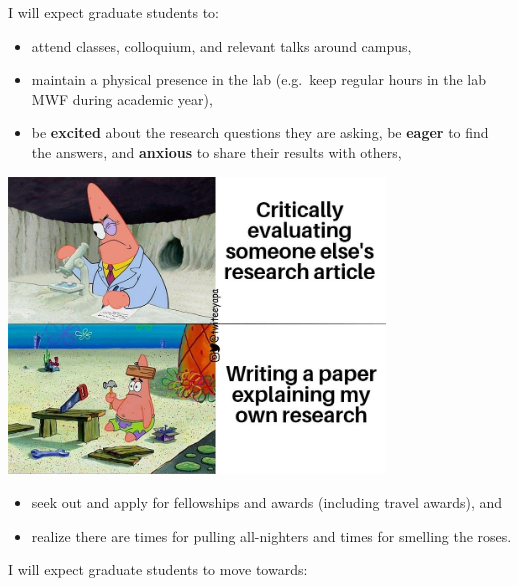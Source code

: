 \documentclass[
]{book}
\providecommand{\tightlist}{%
  \setlength{\itemsep}{0pt}\setlength{\parskip}{0pt}}
\begin{document}
I will expect graduate students to:

\begin{itemize}
\tightlist
\item
  attend classes, colloquium, and relevant talks around campus,
\item
  maintain a physical presence in the lab (e.g.~keep regular hours in the lab MWF during academic year),
\item
  be \textbf{excited} about the research questions they are asking, be \textbf{eager} to find the answers, and \textbf{anxious} to share their results with others,
\end{itemize}

\includegraphics[width=0.75\textwidth,height=\textheight]{images/patrick_writing_paper.jpg}

\begin{itemize}
\tightlist
\item
  seek out and apply for fellowships and awards (including travel awards), and\\
\item
  realize there are times for pulling all-nighters and times for smelling the roses.
\end{itemize}

I will expect graduate students to move towards:
\end{document}
